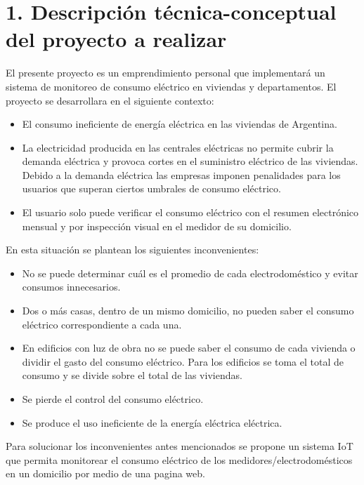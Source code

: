 \documentclass[
11pt, %
]{charter}
\begin{document}
\section{1. Descripción técnica-conceptual del proyecto a realizar}
\label{sec:descripcion}


El presente proyecto es un emprendimiento personal que implementará un sistema de monitoreo de consumo eléctrico en viviendas y departamentos.
El proyecto  se desarrollara en el siguiente contexto:

\begin{itemize}

	\item{El consumo ineficiente de energía eléctrica en las viviendas de Argentina.
	}
	\item{La electricidad producida en las centrales eléctricas no permite cubrir la demanda eléctrica y provoca cortes en el suministro eléctrico de las viviendas. Debido a la demanda eléctrica las empresas imponen penalidades para los usuarios que superan ciertos umbrales de consumo eléctrico.
	}
	\item{El usuario solo puede verificar el consumo eléctrico con el resumen electrónico mensual y por inspección visual en el medidor de su domicilio.
	}
\end{itemize}


En esta situación se plantean los siguientes inconvenientes:

\begin{itemize}

	\item{No se puede determinar cuál es el promedio de cada electrodoméstico y evitar consumos innecesarios.
	}
	\item{Dos o más casas, dentro de un mismo domicilio, no pueden saber el consumo eléctrico correspondiente a cada una.
	}
	\item{En edificios con luz de obra no se puede saber el consumo de cada vivienda o  dividir el gasto del consumo eléctrico. Para los edificios se toma el total de consumo y se divide sobre el total de las viviendas.
	}
	\item{Se pierde el control del consumo eléctrico.
	}
	\item{Se produce el uso ineficiente de la energía eléctrica eléctrica.
	}
\end{itemize}


Para solucionar los inconvenientes antes mencionados se propone un sistema IoT  que permita monitorear el consumo eléctrico de los medidores/electrodomésticos en un domicilio por medio de una pagina web.
\end{document}
